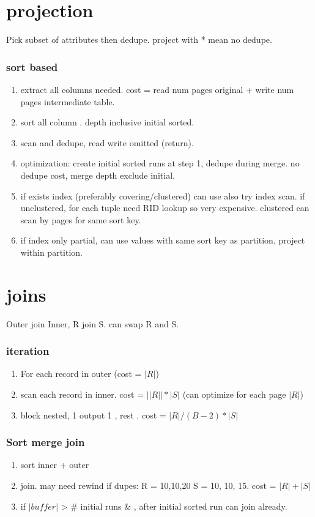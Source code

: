 \documentclass{article}
\begin{document}
\begin{multicols*}{4}
\section{projection}
Pick subset of attributes then dedupe. project with * mean no dedupe.
\subsubsection{sort based}
\begin{enumerate}
  \item extract all columns needed. cost =  read num pages original +  write num pages intermediate table.
  \item sort all column . depth inclusive initial sorted.
  \item scan and dedupe, read  write omitted (return).
  \item optimization: create initial sorted runs at step 1, dedupe during merge. no dedupe cost, merge depth exclude initial.
  \item if exists index (preferably covering/clustered) can use also try index scan. if unclustered, for each tuple need RID lookup so very expensive. clustered can scan by pages for same sort key.
  \item if index only partial, can use values with same sort key as partition, project within partition.
\end{enumerate}

\section{joins}
Outer join Inner, R join S. can swap R and S.
\subsubsection{iteration}
\begin{enumerate}
  \item For each record in outer (cost = $|R|$)
  \item scan each record in inner. cost = $||R|| * |S|$ (can optimize for each page $|R|$)
  \item block nested, 1 output 1 , rest . cost = $|R| / (B - 2) *  |S|$
\end{enumerate}
\subsubsection{Sort merge join}
\begin{enumerate}
  \item sort inner + outer
  \item join. may need rewind if dupes: R = 10,10,20 S = 10, 10, 15. cost = $|R| + |S|$
  \item if $|buffer|$ > \# initial runs  \& , after initial sorted run can join already.
\end{enumerate}


\end{multicols*}
\end{document}
